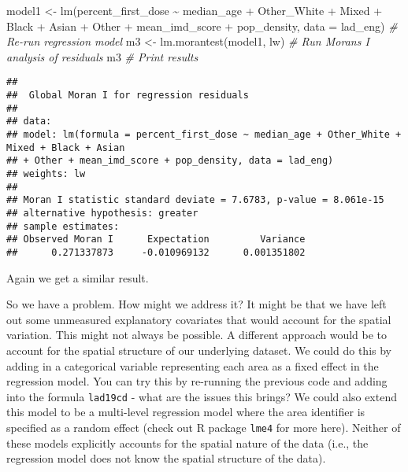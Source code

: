 \documentclass[
]{book}
\newenvironment{Shaded}{\begin{snugshade}}{\end{snugshade}}
\newcommand{\AttributeTok}[1]{\textcolor[rgb]{0.77,0.63,0.00}{#1}}
\newcommand{\CommentTok}[1]{\textcolor[rgb]{0.56,0.35,0.01}{\textit{#1}}}
\newcommand{\FunctionTok}[1]{\textcolor[rgb]{0.00,0.00,0.00}{#1}}
\newcommand{\NormalTok}[1]{#1}
\newcommand{\OtherTok}[1]{\textcolor[rgb]{0.56,0.35,0.01}{#1}}
\newcommand{\SpecialCharTok}[1]{\textcolor[rgb]{0.00,0.00,0.00}{#1}}
\begin{document}
\begin{Shaded}
\begin{Highlighting}[]
\NormalTok{model1 }\OtherTok{\textless{}{-}} \FunctionTok{lm}\NormalTok{(percent\_first\_dose }\SpecialCharTok{\textasciitilde{}}\NormalTok{ median\_age }\SpecialCharTok{+}\NormalTok{ Other\_White }\SpecialCharTok{+}\NormalTok{ Mixed }\SpecialCharTok{+}\NormalTok{ Black }\SpecialCharTok{+}\NormalTok{ Asian }\SpecialCharTok{+}\NormalTok{ Other }\SpecialCharTok{+}\NormalTok{ mean\_imd\_score }\SpecialCharTok{+}\NormalTok{ pop\_density, }\AttributeTok{data =}\NormalTok{ lad\_eng) }\CommentTok{\# Re{-}run regression model}
\NormalTok{m3 }\OtherTok{\textless{}{-}} \FunctionTok{lm.morantest}\NormalTok{(model1, lw) }\CommentTok{\# Run Moran\textquotesingle{}s I analysis of residuals}
\NormalTok{m3 }\CommentTok{\# Print results}
\end{Highlighting}
\end{Shaded}

\begin{verbatim}
## 
##  Global Moran I for regression residuals
## 
## data:  
## model: lm(formula = percent_first_dose ~ median_age + Other_White + Mixed + Black + Asian
## + Other + mean_imd_score + pop_density, data = lad_eng)
## weights: lw
## 
## Moran I statistic standard deviate = 7.6783, p-value = 8.061e-15
## alternative hypothesis: greater
## sample estimates:
## Observed Moran I      Expectation         Variance 
##      0.271337873     -0.010969132      0.001351802
\end{verbatim}

Again we get a similar result.

So we have a problem. How might we address it? It might be that we have left out some unmeasured explanatory covariates that would account for the spatial variation. This might not always be possible. A different approach would be to account for the spatial structure of our underlying dataset. We could do this by adding in a categorical variable representing each area as a fixed effect in the regression model. You can try this by re-running the previous code and adding into the formula \texttt{lad19cd} - what are the issues this brings? We could also extend this model to be a multi-level regression model where the area identifier is specified as a random effect (check out R package \texttt{lme4} for more here). Neither of these models explicitly accounts for the spatial nature of the data (i.e., the regression model does not know the spatial structure of the data).
\end{document}
